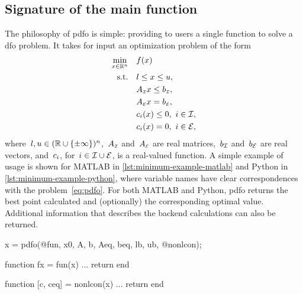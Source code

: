\subsection{Signature of the main function}

The philosophy of \gls{pdfo} is simple: providing to users a single function to solve a \gls{dfo} problem.
It takes for input an optimization problem of the form
\begin{subequations}
    \label{eq:pdfo}
    \begin{align}
        \min_{\iter \in \R^n}   & \quad \obj(\iter)\\
        \text{s.t.}             & \quad \xl \le \iter \le \xu, \label{eq:pdfo-bds}\\
                                & \quad A_{\scriptscriptstyle\iub} \iter \le b_{\scriptscriptstyle\iub}, \label{eq:pdfo-lub}\\
                                & \quad A_{\scriptscriptstyle\ieq} \iter = b_{\scriptscriptstyle\ieq}, \label{eq:pdfo-leq}\\
                                & \quad \con{i}(\iter) \le 0, ~ i \in \iub, \label{eq:pdfo-nlub}\\
                                & \quad \con{i}(\iter) = 0, ~ i \in \ieq, \label{eq:pdfo-nleq}
    \end{align}
\end{subequations}
where~$l, u \in (\mathbb{R} \cup \{\pm \infty\})^n$,~$A_{\scriptscriptstyle\mathcal{I}}$ and~$A_{\scriptscriptstyle\mathcal{E}}$ are real matrices,~$b _{\mathcal{I}}$ and~$b _{\mathcal{E}}$ are real vectors, and~$c_{i}$, for~$i \in \mathcal{I} \cup \mathcal{E}$, is a real-valued function.
A simple example of usage is shown for MATLAB in \cref{lst:minimum-example-matlab} and Python in \cref{lst:minimum-example-python}, where variable names have clear correspondences with the problem~\cref{eq:pdfo}.
For both MATLAB and Python, \gls{pdfo} returns the best point calculated and (optionally) the corresponding optimal value.
Additional information that describes the backend calculations can also be returned.

\begin{lstmatlab}[%
    caption=An elementary example of using \gls{pdfo} in MATLAB,
    label=lst:minimum-example-matlab,
]
    x = pdfo(@fun, x0, A, b, Aeq, beq, lb, ub, @nonlcon);

    function fx = fun(x)
    ...
    return
    end

    function [c, ceq] = nonlcon(x)
    ...
    return
    end
\end{lstmatlab}


